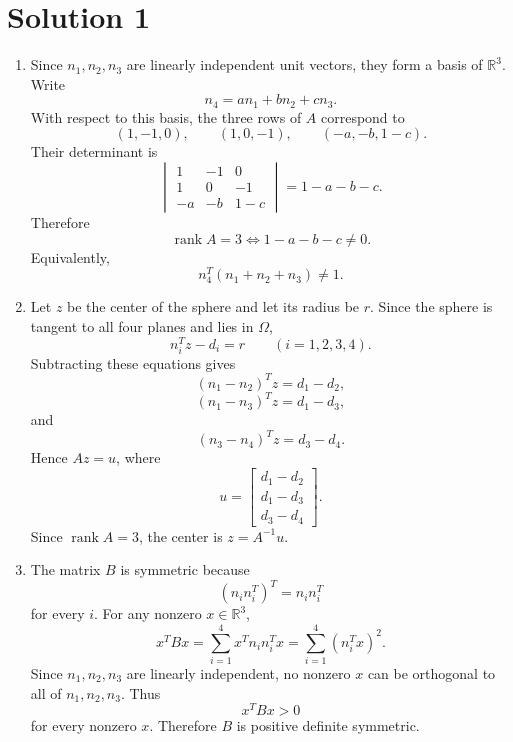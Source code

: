 \documentclass[10pt,a4paper]{article}
\begin{document}
\section*{Solution 1}

\begin{enumerate}
  \item Since $n_1,n_2,n_3$ are linearly independent unit vectors, they form a basis of $\mathbb{R}^3$. Write
        \[
          n_4=an_1+bn_2+cn_3.
        \]
        With respect to this basis, the three rows of $A$ correspond to
        \[
          (1,-1,0),\qquad (1,0,-1),\qquad (-a,-b,1-c).
        \]
        Their determinant is
        \[
          \begin{vmatrix}
            1&-1&0\\
            1&0&-1\\
            -a&-b&1-c
          \end{vmatrix}
          =1-a-b-c.
        \]
        Therefore
        \[
          \operatorname{rank}A=3
          \iff
          1-a-b-c\neq 0.
        \]
        Equivalently,
        \[
          \boxed{
          n_4^T(n_1+n_2+n_3)\neq 1.}
        \]

  \item Let $z$ be the center of the sphere and let its radius be $r$. Since the sphere is tangent to all four planes and lies in $\Omega$,
        \[
          n_i^Tz-d_i=r
          \qquad (i=1,2,3,4).
        \]
        Subtracting these equations gives
        \[
          (n_1-n_2)^Tz=d_1-d_2,
        \]
        \[
          (n_1-n_3)^Tz=d_1-d_3,
        \]
        and
        \[
          (n_3-n_4)^Tz=d_3-d_4.
        \]
        Hence $Az=u$, where
        \[
          \boxed{
          u=
          \begin{bmatrix}
            d_1-d_2\\
            d_1-d_3\\
            d_3-d_4
          \end{bmatrix}.}
        \]
        Since $\operatorname{rank}A=3$, the center is $z=A^{-1}u$.

  \item The matrix $B$ is symmetric because
        \[
          (n_in_i^T)^T=n_in_i^T
        \]
        for every $i$. For any nonzero $x\in\mathbb{R}^3$,
        \[
          x^TBx
          =
          \sum_{i=1}^4 x^Tn_in_i^Tx
          =
          \sum_{i=1}^4(n_i^Tx)^2.
        \]
        Since $n_1,n_2,n_3$ are linearly independent, no nonzero $x$ can be orthogonal to all of $n_1,n_2,n_3$. Thus
        \[
          x^TBx>0
        \]
        for every nonzero $x$. Therefore $B$ is positive definite symmetric.


\end{enumerate}
\end{document}
